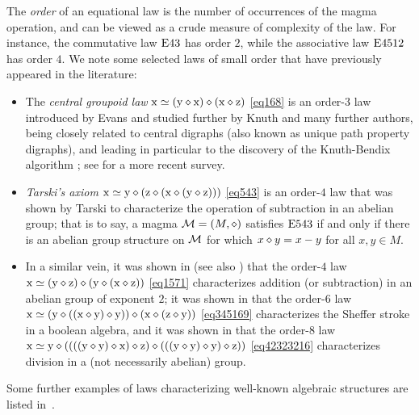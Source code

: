 The \emph{order} of an equational law is the number of occurrences of the magma operation, and can be viewed as a crude measure of complexity of the law. For instance, the commutative law $\mathrm{E}43$ has order $2$, while the associative law $\mathrm{E}4512$ has order $4$. We note some selected laws of small order that have previously appeared in the literature:
\begin{itemize}
\item The \emph{central groupoid law} $\mathrm{x} \simeq (\mathrm{y} \diamond \mathrm{x}) \diamond (\mathrm{x} \diamond \mathrm{z})$ \eqref{eq168} is an order-$3$ law introduced by Evans \cite{evans} and studied further by Knuth \cite{knuth} and many further authors, being closely related to central digraphs (also known as unique path property digraphs), and leading in particular to the discovery of the Knuth-Bendix algorithm \cite{knuth-bendix}; see \cite{klt} for a more recent survey.
\item \emph{Tarski's axiom} $\mathrm{x} \simeq \mathrm{y} \diamond (\mathrm{z} \diamond (\mathrm{x} \diamond (\mathrm{y} \diamond \mathrm{z})))$ \eqref{eq543} is an order-$4$ law that was shown by Tarski \cite{Tarski1938} to characterize the operation of subtraction in an abelian group; that is to say, a magma ${\mathcal{M}} = (M,\diamond)$ satisfies $\mathrm{E}543$ if and only if there is an abelian group structure on ${\mathcal{M}}$ for which $x \diamond y = x-y$ for all $x,y \in M$.
\item In a similar vein, it was shown in \cite{mendelsohn-padmanabhan} (see also \cite{meredith-prior}) that the order-$4$ law
$\mathrm{x} \simeq (\mathrm{y} \diamond \mathrm{z}) \diamond (\mathrm{y} \diamond (\mathrm{x} \diamond \mathrm{z}))$ \eqref{eq1571} characterizes addition (or subtraction) in an abelian group of exponent $2$; it was shown in \cite{mccune_et_al} that the order-$6$ law $\mathrm{x} \simeq (\mathrm{y} \diamond ((\mathrm{x} \diamond \mathrm{y}) \diamond \mathrm{y})) \diamond (\mathrm{x} \diamond (\mathrm{z} \diamond \mathrm{y}))$ \eqref{eq345169} characterizes the Sheffer stroke in a boolean algebra, and it was shown in \cite{higman-neumann} that the order-$8$ law
$\mathrm{x} \simeq \mathrm{y} \diamond ((((\mathrm{y} \diamond \mathrm{y}) \diamond \mathrm{x}) \diamond \mathrm{z}) \diamond (((\mathrm{y} \diamond \mathrm{y}) \diamond \mathrm{y}) \diamond \mathrm{z}))$ \eqref{eq42323216} characterizes division in a (not necessarily abelian) group.
\end{itemize}
Some further examples of laws characterizing well-known algebraic structures are listed in~\cite{mccune-survey}.

